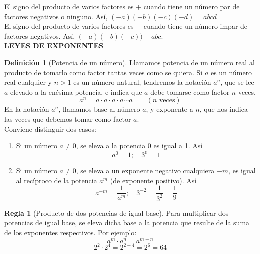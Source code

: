 \documentclass[12pt,letterpaper]{article}
\theoremstyle{definition}
\newtheorem{defn}{Definición}
\newtheorem{reg}{Regla}
\begin{document}
El signo del producto de varios factores es $+$ cuando tiene un número par de factores negativos o ninguno. Así, $(-a)(-b)(-c)(-d)=abcd$\\
El signo del producto de varios factores es $-$ cuando tiene un número impar de factores negativos. Así, $(-a)(-b)(-c))-abc$.\\

\textbf{LEYES DE EXPONENTES}

\begin{defn}[Potencia de un número]
Llamamos potencia de un número real al producto de tomarlo como factor tantas veces como se quiera. Si $a$ es un número real cualquier y $n>1$ es un número natural, tendremos la notación $a^n$, que se lee $a$ elevado a la enésima potencia, e indica que $a$ debe tomarse como factor $n$ veces.
\begin{equation*}
a^n=a\cdot a\cdot a\cdot a \cdots a \qquad (n \text{ veces})
\end{equation*}
En la notación $a^n$, llamamos base al número $a$, y exponente a $n$, que nos indica las veces que debemos tomar como factor $a$.\\
Conviene distinguir dos casos:
\begin{enumerate}
\item Si un número $a\neq 0$, se eleva a la potencia 0 es igual a 1. Así
\begin{equation*}
a^0=1; \quad 3^0=1
\end{equation*}
\item Si un número $a\neq 0$, se eleva a un exponente negativo cualquiera $-m$, es igual al recíproco de la potencia $a^m$ (de exponente positivo). Así
\begin{equation*}
a^{-m}=\dfrac{1}{a^m}; \quad 3^{-2}=\dfrac{1}{3^2}=\dfrac{1}{9}
\end{equation*}
\end{enumerate}

\end{defn}

\begin{reg}[Producto de dos potencias de igual base] %
Para multiplicar dos potencias de igual base, se eleva dicha base a la potencia que resulte de la suma de los exponentes respectivos. Por ejemplo:
\begin{equation*}
a^m\cdot a^n = a^{m+n}
\end{equation*}
\begin{equation*}
2^2 \cdot 2^4 = 2^{2+4} = 2^6 = 64
\end{equation*}
\end{reg}
\end{document}
